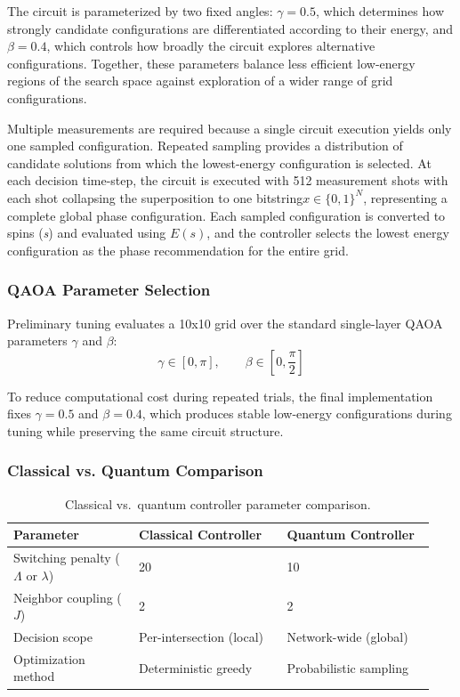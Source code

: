\documentclass[12pt]{article}
\begin{document}
The circuit is parameterized by two fixed angles: $\gamma =0.5$, which determines how strongly candidate configurations are differentiated according to their energy, and $\beta =0.4$, which controls how broadly the circuit explores alternative configurations. Together, these parameters balance less efficient low-energy regions of the search space against exploration of a wider range of grid configurations.

Multiple measurements are required because a single circuit execution yields only one sampled configuration. Repeated sampling provides a distribution of candidate solutions from which the lowest-energy configuration is selected. At each decision time-step, the circuit is executed with 512 measurement shots with each shot collapsing the superposition to one bitstring$x \in \{0,1\}^N$, representing a complete global phase configuration. Each sampled configuration is converted to spins (\emph{s}) and evaluated using $E(s)$, and the controller selects the lowest energy configuration as the phase recommendation for the entire grid.

\subsubsection{QAOA Parameter Selection}

Preliminary tuning evaluates a 10x10 grid over the standard single-layer QAOA parameters $\gamma$ and $\beta$:
\[
\gamma \in [0,\pi], \qquad \beta \in \left[0,\frac{\pi}{2}\right]
\]

To reduce computational cost during repeated trials, the final implementation fixes  $\gamma =0.5$ and $\beta =0.4$, which produces stable low-energy configurations during tuning while preserving the same circuit structure.

\subsubsection{Classical vs. Quantum Comparison}

\begin{table}[H]
\centering
\begin{tabular}{@{} p{0.28\linewidth} p{0.33\linewidth} p{0.33\linewidth} @{}}
\toprule
\textbf{Parameter} & \textbf{Classical Controller} & \textbf{Quantum Controller} \\
\midrule
Switching penalty ($\Lambda$ or $\lambda$) & 20 & 10 \\
Neighbor coupling ($J$) & 2 & 2 \\

Decision scope & Per-intersection (local) & Network-wide (global) \\
Optimization method & Deterministic greedy & Probabilistic sampling \\
\bottomrule
\end{tabular}
\caption{Classical vs.\ quantum controller parameter comparison.}
\label{tab:classical-vs-quantum-params}
\end{table}
\end{document}
